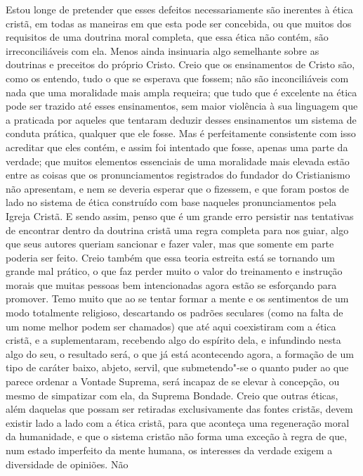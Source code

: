 Estou longe de pretender que esses defeitos necessariamente são
inerentes à ética cristã, em todas as maneiras em que esta pode ser
concebida, ou que muitos dos requisitos de uma doutrina moral completa,
que essa ética não contém, são irreconciliáveis com ela. Menos ainda
insinuaria algo semelhante sobre as doutrinas e preceitos do próprio
Cristo. Creio que os ensinamentos de Cristo são, como os entendo,
tudo o que se esperava que fossem; não são inconciliáveis com nada que uma
moralidade mais ampla requeira; que tudo que é excelente na ética pode
ser trazido até esses ensinamentos, sem maior violência à sua linguagem
que a praticada por aqueles que tentaram deduzir desses ensinamentos um
sistema de conduta prática, qualquer que ele fosse. Mas é perfeitamente
consistente com isso acreditar que eles contém, e assim foi intentado
que fosse, apenas uma parte da verdade; que muitos elementos essenciais
de uma moralidade mais elevada estão entre as coisas que os
pronunciamentos registrados do fundador do Cristianismo não apresentam,
e nem se deveria esperar que o fizessem, e que foram postos de lado no
sistema de ética construído com base naqueles pronunciamentos pela
Igreja Cristã. E sendo assim, penso que é um grande erro
persistir nas tentativas de encontrar dentro da doutrina cristã uma
regra completa para nos guiar, algo que seus autores queriam 
sancionar e fazer valer, mas que somente em parte poderia
ser feito. Creio também que essa teoria estreita está se tornando um
grande mal prático, o que faz perder muito o valor do treinamento e
instrução morais que muitas pessoas bem intencionadas agora estão se
esforçando para promover. Temo muito que ao se tentar formar a mente e
os sentimentos de um modo totalmente religioso, descartando os padrões
seculares (como na falta de um nome melhor podem ser chamados) que até
aqui coexistiram com a ética cristã, e a suplementaram, recebendo algo
do espírito dela, e infundindo nesta algo do seu, o resultado será, o
que já está acontecendo agora, a formação de um tipo de caráter baixo,
abjeto, servil, que submetendo"-se o quanto puder ao que parece
ordenar a Vontade Suprema, será incapaz de se elevar à concepção, ou
mesmo de simpatizar com ela, da Suprema Bondade. Creio que outras
éticas, além daquelas que possam ser retiradas exclusivamente das fontes
cristãs, devem existir lado a lado com a ética cristã, para que
aconteça uma regeneração moral da humanidade, e que o sistema cristão
não forma uma exceção à regra de que, num estado imperfeito da mente
humana, os interesses da verdade exigem a diversidade de opiniões. Não
